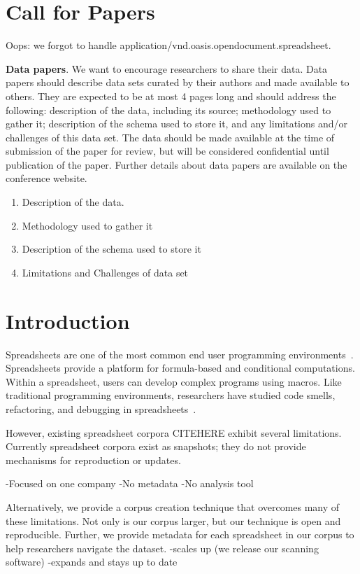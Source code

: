 \documentclass[conference]{IEEEtran}
\begin{document}
\section{Call for Papers}

Oops: we forgot to handle application/vnd.oasis.opendocument.spreadsheet.

\textbf{Data papers}. We want to encourage researchers to share their data. Data papers should describe data sets curated by their authors and made available to others. They are expected to be at most 4 pages long and should address the following: description of the data, including its source; methodology used to gather it; description of the schema used to store it, and any limitations and/or challenges of this data set. The data should be made available at the time of submission of the paper for review, but will be considered confidential until publication of the paper. Further details about data papers are available on the conference website. 

\begin{enumerate}
\item Description of the data.
\item Methodology used to gather it
\item Description of the schema used to store it
\item Limitations and Challenges of data set
\end{enumerate}

\section{Introduction}
Spreadsheets are one of the most common end user programming environments~\cite{Scaffidi2005}. 
Spreadsheets provide a platform for formula-based and conditional computations. 
Within a spreadsheet, users can develop complex programs using macros. 
Like traditional programming environments, researchers have studied code smells, refactoring, and debugging in spreadsheets~\cite{Pinzger2012,Badame2012,Abraham2007}.

However, existing spreadsheet corpora CITEHERE exhibit several limitations.
Currently spreadsheet corpora exist as snapshots; they do not provide mechanisms for reproduction or updates.

-Focused on one company
-No metadata
-No analysis tool

Alternatively, we provide a corpus creation technique that overcomes many of these limitations. Not only is our corpus larger, but our technique is open and  reproducible.  Further, we provide metadata for each spreadsheet in our corpus to help researchers navigate the dataset.
-scales up (we release our scanning software)
-expands and stays up to date
\end{document}
